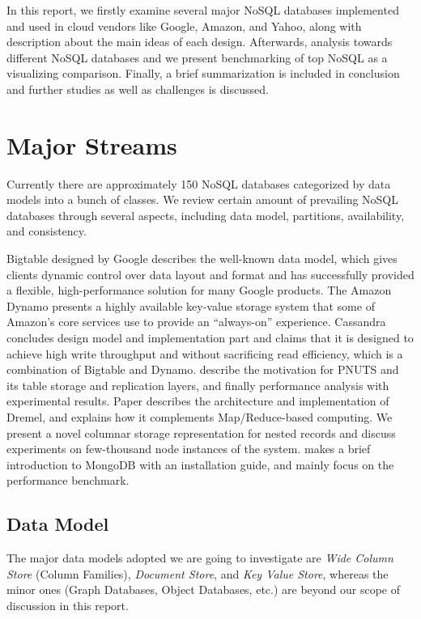 \documentclass[12pt,letter]{article}
\begin{document}
In this report, we firstly examine several major NoSQL databases implemented and used in cloud vendors like Google, Amazon, and Yahoo, along with description about the main ideas of each design. Afterwards, analysis towards different NoSQL databases and we present benchmarking of top NoSQL as a visualizing comparison. Finally, a brief summarization is included in conclusion and further studies as well as challenges is discussed.

\section{Major Streams}
Currently there are approximately 150 NoSQL databases categorized by data models into a bunch of classes.\citep{Unknown2012} We review certain amount of prevailing NoSQL databases through several aspects, including data model, partitions, availability, and consistency. 

Bigtable\citep{Chang2006} designed by Google describes the well-known data model, which gives clients dynamic control over data layout and format and has successfully provided a flexible, high-performance solution for many Google products. 
The Amazon Dynamo\citep{DeCandia2007} presents a highly available key-value storage system that some of Amazon's core services use to provide an ``always-on'' experience.
Cassandra\citep{LakshamAvinash2010} concludes design model and implementation part and claims that it is designed to achieve high write throughput and without sacrificing read efficiency, which is a combination of Bigtable and Dynamo. 
\citep{Silberstein2008} describe the motivation for PNUTS and its table storage and replication layers, and finally performance analysis with experimental results.  
Paper \citep{Melnik2010} describes the architecture and implementation of Dremel, and explains how it complements Map/Reduce-based computing. We present a novel columnar storage representation for nested records and discuss experiments on few-thousand node instances of the system.
\citep{Suter2012} makes a brief introduction to MongoDB with an installation guide, and mainly focus on the performance benchmark.

\subsection{Data Model} \label{datamodel}
The major data models adopted we are going to investigate are \textit{Wide Column Store} (Column Families), \textit{Document Store}, and \textit{Key Value Store}, whereas the minor ones (Graph Databases, Object Databases, etc.) are beyond our scope of discussion in this report. 
\end{document}
